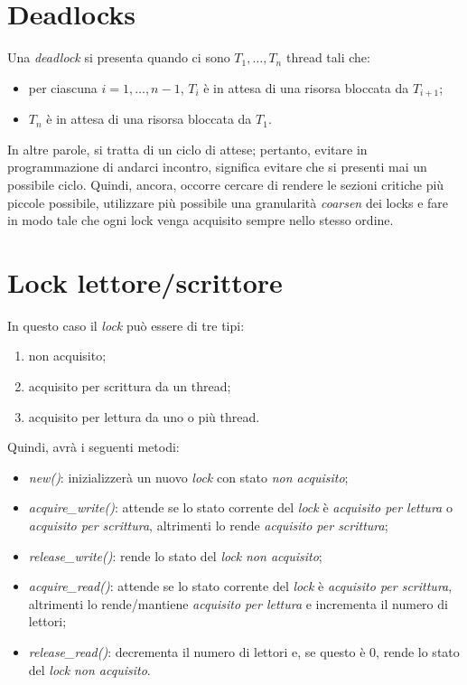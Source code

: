 \section{Deadlocks}
Una \textit{deadlock} si presenta quando ci sono $T_{1}, \ldots, T_{n}$ thread tali che:
\begin{itemize}
	\item per ciascuna $i = 1, \ldots, n-1$, $T_{i}$ è in attesa di una risorsa bloccata da $T_{i+1}$;
	\item $T_{n}$ è in attesa di una risorsa bloccata da $T_{1}$.
\end{itemize}
In altre parole, si tratta di un ciclo di attese; pertanto, evitare in programmazione di andarci incontro, significa evitare che si presenti mai un possibile ciclo.
Quindi, ancora, occorre cercare di rendere le sezioni critiche più piccole possibile, utilizzare più possibile una granularità \textit{coarsen} dei locks e fare in modo tale che ogni lock venga acquisito sempre nello stesso ordine.

\section{Lock lettore/scrittore}
In questo caso il \textit{lock} può essere di tre tipi:
\begin{enumerate}
	\item non acquisito;
	\item acquisito per scrittura da un thread;
	\item acquisito per lettura da uno o più thread.
\end{enumerate}
Quindi, avrà i seguenti metodi:
\begin{itemize}
	\item \textit{new()}: inizializzerà un nuovo \textit{lock} con stato \textit{non acquisito};
	\item \textit{acquire\_write()}: attende se lo stato corrente del \textit{lock} è \textit{acquisito per lettura} o \textit{acquisito per scrittura}, altrimenti lo rende \textit{acquisito per scrittura};
	\item \textit{release\_write()}: rende lo stato del \textit{lock} \textit{non acquisito};
	\item \textit{acquire\_read()}: attende se lo stato corrente del \textit{lock} è \textit{acquisito per scrittura}, altrimenti lo rende/mantiene \textit{acquisito per lettura} e incrementa il numero di lettori;
	\item \textit{release\_read()}: decrementa il numero di lettori e, se questo è $0$, rende lo stato del \textit{lock} \textit{non acquisito}.
\end{itemize}

